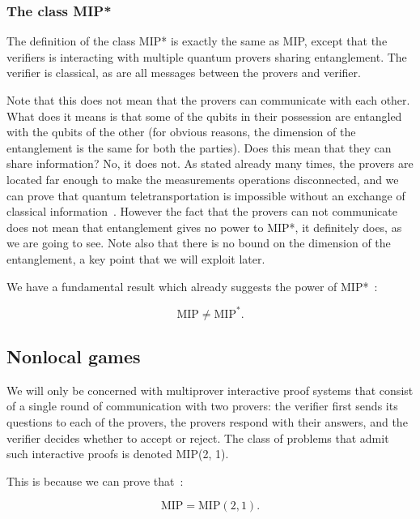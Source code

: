 \subsubsection{The class MIP*}
The definition of the class MIP* is exactly the same as MIP, except that the verifiers is interacting with multiple quantum provers sharing entanglement. The verifier is classical, as are all messages between the provers and verifier. 

Note that this does not mean that the provers can communicate with each other. What does it means is that some of the qubits in their possession are entangled with the qubits of the other (for obvious reasons, the dimension of the entanglement is the same for both the parties). Does this mean that they can share information? No, it does not. As stated already many times, the provers are located far enough to make the measurements operations disconnected, and we can prove that quantum teletransportation is impossible without an exchange of classical information~\cite{NielsenChuang}. However the fact that the provers can not communicate does not mean that entanglement gives no power to MIP*, it definitely does, as we are going to see.
Note also that there is no bound on the dimension of the entanglement, a key point that we will exploit later.

We have a fundamental result which already suggests the power of MIP*~\cite{mipre}:

\begin{theorem}
    \begin{equation}
\text{MIP} \neq \text{MIP}^{*}.
    \end{equation}
\end{theorem}

\subsection{Nonlocal games}

We will only be concerned with multiprover interactive proof systems
that consist of a single round of communication with two provers: the verifier first sends its questions to
each of the provers, the provers respond with their answers, and the verifier decides whether to accept or
reject. The class of problems that admit such interactive proofs is denoted MIP(2, 1).

This is because we can prove that~\cite{mipre}:
\begin{theorem}
    \begin{equation}
    \text{MIP}=\text{MIP}(2,1).
    \end{equation}
\end{theorem}

